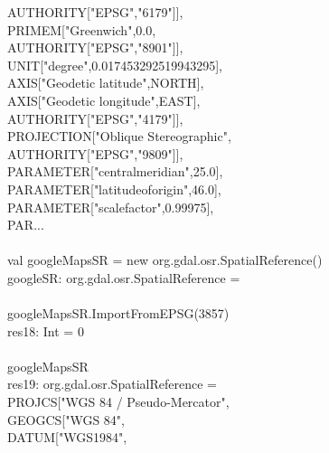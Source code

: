 \documentclass {article}
\begin{document}
\hspace*{6mm} AUTHORITY["EPSG","6179"]],\\
\hspace*{4mm} PRIMEM["Greenwich",0.0,\\
\hspace*{6mm} AUTHORITY["EPSG","8901"]],\\
\hspace*{4mm} UNIT["degree",0.017453292519943295],\\
\hspace*{4mm} AXIS["Geodetic latitude",NORTH],\\
\hspace*{4mm} AXIS["Geodetic longitude",EAST],\\
\hspace*{4mm} AUTHORITY["EPSG","4179"]],\\
\hspace*{2mm} PROJECTION["Oblique Stereographic",\\
\hspace*{4mm} AUTHORITY["EPSG","9809"]],\\
\hspace*{2mm} PARAMETER["central\underline{\space}meridian",25.0],\\
\hspace*{2mm} PARAMETER["latitude\underline{\space}of\underline{\space}origin",46.0],\\
\hspace*{2mm} PARAMETER["scale\underline{\space}factor",0.99975],\\
\hspace*{4mm} PAR...\\
\\
val googleMapsSR = new org.gdal.osr.SpatialReference()\\
googleSR: org.gdal.osr.SpatialReference = \\
\\
googleMapsSR.ImportFromEPSG(3857) \\
res18: Int = 0 \\
\\
googleMapsSR \\
res19: org.gdal.osr.SpatialReference = \\
PROJCS["WGS 84 / Pseudo-Mercator",\\
\hspace*{2mm} GEOGCS["WGS 84",\\
\hspace*{4mm} DATUM["WGS\underline{\space}1984",\\
\end{document}
